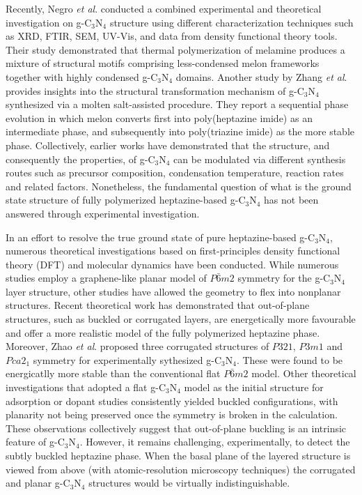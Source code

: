 Recently, Negro \textit{et al}.\cite{Negro2023CombinedProperties} conducted a combined experimental and theoretical investigation on g-C$_3$N$_4$ structure using different characterization techniques such as XRD, FTIR, SEM, UV-Vis, and data from density functional theory tools. Their study demonstrated that thermal polymerization of melamine produces a mixture of structural motifs comprising less-condensed melon frameworks together with highly condensed g-C$_3$N$_4$ domains. Another study by Zhang \textit{et al}.\cite{Zhang2023Salt-MediatedPhotocatalysis} provides insights into the structural transformation mechanism of g-C$_3$N$_4$ synthesized via a molten salt-assisted procedure. They report a sequential phase evolution in which melon converts first into poly(heptazine imide) as an intermediate phase, and subsequently into poly(triazine imide) as the more stable phase. Collectively, earlier works have demonstrated that the structure, and consequently the properties, of g-C$_3$N$_4$ can be modulated via different synthesis routes such as precursor composition, condensation temperature, reaction rates and related factors.\cite{Ma2024TheModification,Zhang2025FunctionalNitride} Nonetheless, the fundamental question of what is the ground state structure of fully polymerized heptazine-based g-C$_3$N$_4$ has not been answered through experimental investigation. 

In an effort to resolve the true ground state of pure heptazine-based  g-C$_3$N$_4$, numerous theoretical investigations based on first-principles density functional theory (DFT) and molecular dynamics have been conducted.\cite{Wang2018TheStudy,Wang2017DeterminationValidation,Gao2020CorrugationStudies}
While numerous studies employ a graphene-like planar model of $P\bar{6}m2$ symmetry for the g-C$_3$N$_4$ layer structure, other studies have allowed the geometry to flex into nonplanar structures.
Recent theoretical work\cite{Im2023StructureSimulations,Fao2022TheoreticalPd,Hartley2021ComputationalSplitting} has demonstrated that out-of-plane structures, such as buckled or corrugated layers, are energetically more favourable and offer a more realistic model of the fully polymerized heptazine phase. Moreover, Zhao \textit{et al}. \cite{zhao2021NewNitride} proposed three corrugated structures of $P321$, $P3m1$ and $Pca2_1$ symmetry for experimentally sythesized g-C$_3$N$_4$. These were found to be energicatlly more stable than the conventional flat $P\bar{6}m2$ model. Other theoretical investigations  that adopted a flat g-C$_3$N$_4$ model as the initial structure for adsorption or dopant studies consistently yielded buckled configurations, with planarity not being preserved once the symmetry is broken in the calculation.\cite{Azofra2016AConversion,Zhou2022TheStudy,Zhang2017PhotocatalyticG-C3N4b,Ji2016Heptazine-basedMembrane} These observations collectively suggest that out-of-plane buckling is an intrinsic feature of g-C$_3$N$_4$. However, it remains challenging, experimentally, to detect the subtly buckled heptazine phase.
When the basal plane of the layered structure is viewed from above
(with atomic-resolution microscopy techniques) the corrugated and planar g-C$_3$N$_4$ structures would be virtually indistinguishable.

